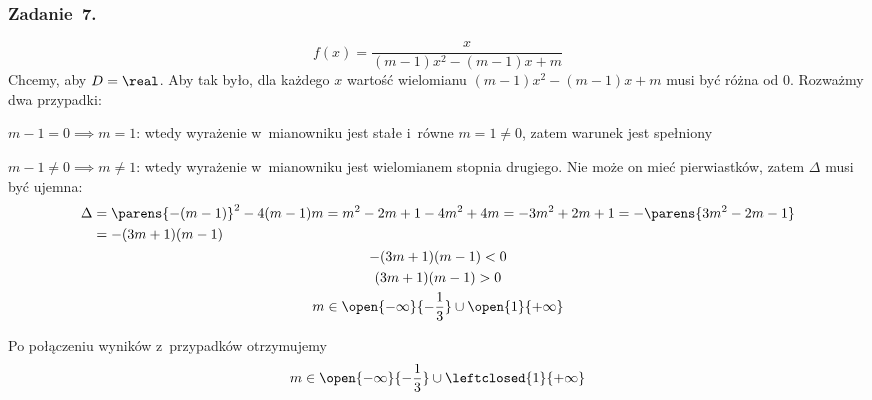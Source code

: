 \subsubsection*{Zadanie~7.}
\begin{equation*}
    f(x) = \frac{x}{(m - 1)x^2 - (m - 1)x + m}
\end{equation*}
Chcemy, aby \(D = \real\). Aby tak było, dla każdego \(x\) wartość wielomianu \((m - 1)x^2 - (m - 1)x + m\) musi być różna od \(0\). Rozważmy dwa przypadki:
\begin{proofcases}
    \item \(m - 1 = 0 \implies m = 1\): wtedy wyrażenie w~mianowniku jest stałe i~równe \(m = 1 \neq 0\), zatem warunek jest spełniony
    \item \(m - 1 \neq 0 \implies m \neq 1\): wtedy wyrażenie w~mianowniku jest wielomianem stopnia drugiego. Nie może on mieć pierwiastków, zatem \(\Delta\) musi być ujemna:
        \begin{gather*}
            \begin{split}
                \Delta
                    &= \parens{-(m - 1)}^2 - 4(m - 1)m
                    = m^2 - 2m + 1 - 4m^2 + 4m
                    = -3m^2 + 2m + 1
                    = -\parens{3m^2 - 2m - 1}\\
                    &= -(3m + 1)(m - 1)
            \end{split}\\
            -(3m + 1)(m - 1) < 0\\
            (3m + 1)(m - 1) > 0\\
            m \in \open{-\infty}{-\frac{1}{3}} \cup \open{1}{+\infty}
        \end{gather*}
\end{proofcases}
Po połączeniu wyników z~przypadków otrzymujemy
\begin{equation*}
    m \in \open{-\infty}{-\frac{1}{3}} \cup \leftclosed{1}{+\infty}
\end{equation*}
